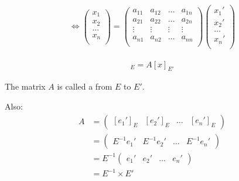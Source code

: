     \begin{align*}
      \Leftrightarrow
      \begin{pmatrix}
        x_{1}  \\
        x_{2}  \\
        \ldots \\
        x_{n}  \\
      \end{pmatrix}
      =
      \begin{pmatrix}
        a_{11} & a_{12} & \ldots & a_{1n} \\
        a_{21} & a_{22} & \ldots & a_{2n} \\
        \vdots & \vdots & \vdots & \vdots \\
        a_{n1} & a_{n2} & \ldots & a_{nn} \\
      \end{pmatrix}
      \begin{pmatrix}
        x_{1}' \\
        x_{2}' \\
        \ldots \\
        x_{n}' \\
      \end{pmatrix}
    \end{align*}

    \begin{align*}
      [x]_{E} = A[x]_{E'}
    \end{align*}

    \par The matrix $A$ is called a  from $E$ to $E'$.

    \par Also:
    \begin{align*}
      A &=
      \begin{pmatrix}
        [e_{1}']_{E} & [e_{2}']_{E} & \ldots & [e_{n}']_{E}
      \end{pmatrix} \\
      &=
      \begin{pmatrix}
        E^{-1}e_{1}' & E^{-1}e_{2}' & \ldots & E^{-1}e_{n}'
      \end{pmatrix} \\
      &= E^{-1}
      \begin{pmatrix}
        e_{1}' & e_{2}' & \ldots & e_{n}'
      \end{pmatrix} \\
      &= E^{-1} \times E'
    \end{align*}
